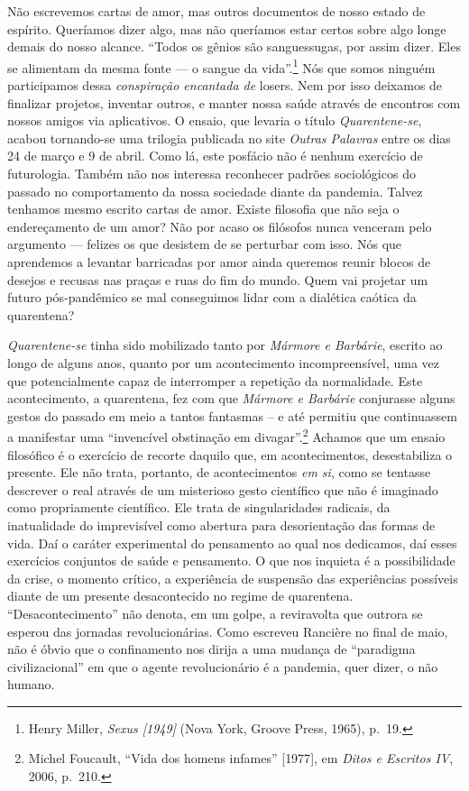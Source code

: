 Não escrevemos cartas de amor, mas outros documentos de nosso estado de
espírito. Queríamos dizer algo, mas não queríamos estar certos sobre
algo longe demais do nosso alcance. ``Todos os gênios são sanguessugas,
por assim dizer. Eles se alimentam da mesma fonte --- o sangue da
vida''.\footnote{Henry Miller, \emph{Sexus {[}1949{]}} (Nova York,
  Groove Press, 1965), p.~19.} Nós que somos ninguém participamos dessa
\emph{conspiração encantada de} losers. Nem por isso deixamos de
finalizar projetos, inventar outros, e manter nossa saúde através de
encontros com nossos amigos via aplicativos. O ensaio, que levaria o
título \emph{Quarentene-se}, acabou tornando-se uma trilogia publicada
no site \emph{Outras Palavras} entre os dias 24 de março e 9 de abril.
Como lá, este posfácio não é nenhum exercício de futurologia. Também não
nos interessa reconhecer padrões sociológicos do passado no
comportamento da nossa sociedade diante da pandemia. Talvez tenhamos
mesmo escrito cartas de amor. Existe filosofia que não seja o
endereçamento de um amor? Não por acaso os filósofos nunca venceram pelo
argumento --- felizes os que desistem de se perturbar com isso. Nós que
aprendemos a levantar barricadas por amor ainda queremos reunir blocos
de desejos e recusas nas praças e ruas do fim do mundo. Quem vai
projetar um futuro pós-pandêmico se mal conseguimos lidar com a
dialética caótica da quarentena?

\emph{Quarentene-se} tinha sido mobilizado tanto por \emph{Mármore e
Barbárie}, escrito ao longo de alguns anos, quanto por um acontecimento
incompreensível, uma vez que potencialmente capaz de interromper a
repetição da normalidade. Este acontecimento, a quarentena, fez com que
\emph{Mármore e Barbárie} conjurasse alguns gestos do passado em meio a
tantos fantasmas -- e até permitiu que continuassem a manifestar uma
``invencível obstinação em divagar''.\footnote{Michel Foucault, ``Vida
  dos homens infames'' {[}1977{]}, em \emph{Ditos e Escritos IV}, 2006,
  p.~210.} Achamos que um ensaio filosófico é o exercício de recorte
daquilo que, em acontecimentos, desestabiliza o presente. Ele não trata,
portanto, de acontecimentos \emph{em si}, como se tentasse descrever o
real através de um misterioso gesto científico que não é imaginado como
propriamente científico. Ele trata de singularidades radicais, da
inatualidade do imprevisível como abertura para desorientação das formas
de vida. Daí o caráter experimental do pensamento ao qual nos dedicamos,
daí esses exercícios conjuntos de saúde e pensamento. O que nos inquieta
é a possibilidade da crise, o momento crítico, a experiência de
suspensão das experiências possíveis diante de um presente desacontecido
no regime de quarentena. ``Desacontecimento'' não denota, em um golpe, a
reviravolta que outrora se esperou das jornadas revolucionárias. Como
escreveu Rancière no final de maio, não é óbvio que o confinamento nos
dirija a uma mudança de ``paradigma civilizacional'' em que o agente
revolucionário é a pandemia, quer dizer, o não humano.~

